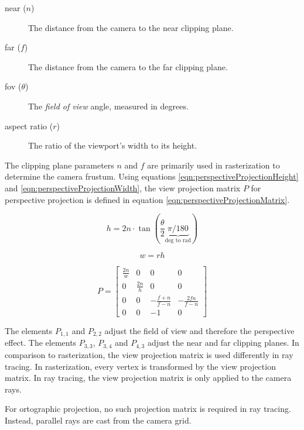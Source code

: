 \begin{description}
    \item[near ($n$)] The distance from the camera to the near clipping plane.
    \item[far ($f$)] The distance from the camera to the far clipping plane.
    \item[fov ($\theta$)] The \textit{field of view} angle, measured in degrees.
    \item[aspect ratio ($r$)] The ratio of the viewport's width to its height.
\end{description}

The clipping plane parameters $n$ and $f$ are primarily used in rasterization to determine the camera frustum. Using equations \ref{eqn:perspectiveProjectionHeight} and \ref{eqn:perspectiveProjectionWidth}, the view projection matrix $P$ for perspective projection is defined in equation \ref{eqn:perspectiveProjectionMatrix}.

\begin{equation}
    \label{eqn:perspectiveProjectionHeight}
    h = 2n \cdot \tan(\frac{\theta}{2} \underbrace{\pi / 180}_{\text{deg to rad}})
\end{equation}

\begin{equation}
    \label{eqn:perspectiveProjectionWidth}
    w = rh
\end{equation}

\begin{equation}
    \label{eqn:perspectiveProjectionMatrix}
    P = 
    \begin{bmatrix}
        \frac{2n}{w} & 0 & 0 & 0 \\
        0 & \frac{2n}{h} & 0 & 0 \\
        0 & 0 & -\frac{f + n}{f - n} & -\frac{2fn}{f - n} \\
        0 & 0 & -1 & 0
    \end{bmatrix}
\end{equation}

The elements $P_{1,1}$ and $P_{2,2}$ adjust the field of view and therefore the perspective effect. The elements $P_{3,3}$, $P_{3,4}$ and $P_{4,3}$ adjust the near and far clipping planes. In comparison to rasterization, the view projection matrix is used differently in ray tracing. In rasterization, every vertex is transformed by the view projection matrix. In ray tracing, the view projection matrix is only applied to the camera rays.

For ortographic projection, no such projection matrix is required in ray tracing. Instead, parallel rays are cast from the camera grid.

